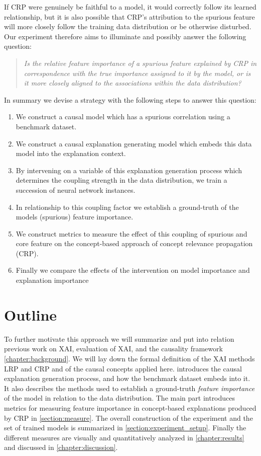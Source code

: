 If CRP were genuinely be faithful to a model, it would correctly follow its learned relationship, but it is also possible that CRP's attribution to the spurious feature will more closely follow the training data distribution or be otherwise disturbed. Our experiment therefore aims to illuminate and possibly answer the following question: 

\begin{quote}
\textit{Is the relative feature importance of a spurious feature explained by CRP in correspondence with the true importance assigned to it by the model, or is it more closely aligned to the associations within the data distribution?}
\end{quote} 

\filbreak
In summary we devise a strategy with the following steps to answer this question:
\begin{enumerate}
    \item We construct a causal model which has a spurious correlation using a benchmark dataset.
    \item We construct a causal explanation generating model which embeds this data model into the explanation context.
    \item By intervening on a variable of this explanation generation process which determines the coupling strength in the data distribution, we train a succession of neural network instances.
    \item In relationship to this coupling factor we establish a ground-truth of the models (spurious) feature importance.
    \item We construct metrics to measure the effect of this coupling of spurious and core feature on the concept-based approach of concept relevance propagation (CRP).
    \item Finally we compare the effects of the intervention on model importance and explanation importance
\end{enumerate}
\filbreak

\section{Outline}
To further motivate this approach we will summarize and put into relation previous work on XAI, evaluation of XAI, and the causality framework \cref{chapter:background}. We will lay down the formal definition of the XAI methods LRP and CRP and of the causal concepts applied here.
 introduces the causal explanation generation process, and how the benchmark dataset embeds into it. It also describes the methods used to establish a ground-truth \textit{feature importance} of the model in relation to the data distribution. 
The main part introduces metrics for measuring feature importance in concept-based explanations produced by CRP in \cref{section:measure}. The overall construction of the experiment and the set of trained models is summarized in \cref{section:experiment_setup}. Finally the different measures are visually and quantitatively analyzed in \cref{chapter:results} and discussed in \cref{chapter:discussion}.
